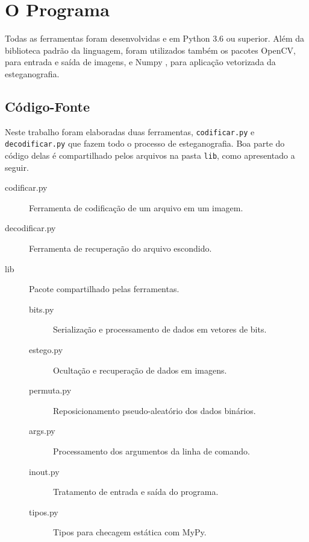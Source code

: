 \section{O Programa} \label{sec:programa}

Todas as ferramentas foram desenvolvidas e  em Python 3.6 ou superior. Além da biblioteca padrão da linguagem, foram utilizados também os pacotes OpenCV, para entrada e saída de imagens, e Numpy , para aplicação vetorizada da esteganografia.

\subsection{Código-Fonte}

    Neste trabalho foram elaboradas duas ferramentas, \texttt{codificar.py} e \texttt{decodificar.py} que fazem todo o processo de esteganografia. Boa parte do código delas é compartilhado pelos arquivos na pasta \texttt{lib}, como apresentado a seguir.

    \begin{description}
        \item[codificar.py] Ferramenta de codificação de um arquivo em um imagem.

        \item[decodificar.py] Ferramenta de recuperação do arquivo escondido.

        \item[lib] Pacote compartilhado pelas ferramentas.

        \begin{description}
            \item[bits.py] Serialização e processamento de dados em vetores de bits.

            \item[estego.py] Ocultação e recuperação de dados em imagens.

            \item[permuta.py] Reposicionamento pseudo-aleatório dos dados binários.

            \item[args.py] Processamento dos argumentos da linha de comando.

            \item[inout.py] Tratamento de entrada e saída do programa.

            \item[tipos.py] Tipos para checagem estática com MyPy.
        \end{description}
    \end{description}

